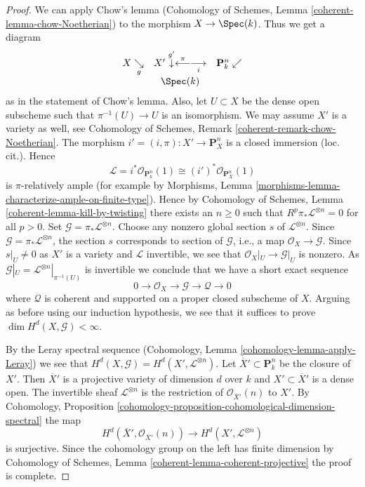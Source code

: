 \begin{proof}
\medskip\noindent
We can apply Chow's lemma
(Cohomology of Schemes, Lemma \ref{coherent-lemma-chow-Noetherian})
to the morphism $X \to \Spec(k)$. Thus we get a diagram
$$
\begin{array}{ccc}X \underset{g}{\searrow} & X' \overset{g'}{\downarrow}\overset{\pi}{\longleftarrow}\underset{i}{\longrightarrow} & \mathbf{P}^n_k \swarrow \\  & \Spec(k) & \end{array}
$$
as in the statement of Chow's lemma. Also, let $U \subset X$ be
the dense open subscheme such that $\pi^{-1}(U) \to U$ is an isomorphism.
We may assume $X'$ is a variety as well, see
Cohomology of Schemes, Remark \ref{coherent-remark-chow-Noetherian}.
The morphism $i' = (i, \pi) : X' \to \mathbf{P}^n_X$ is
a closed immersion (loc. cit.). Hence
$$
\mathcal{L} = i^*\mathcal{O}_{\mathbf{P}^n_k}(1) \cong
(i')^*\mathcal{O}_{\mathbf{P}^n_X}(1)
$$
is $\pi$-relatively ample (for example by
Morphisms, Lemma \ref{morphisms-lemma-characterize-ample-on-finite-type}).
Hence by Cohomology of Schemes, Lemma \ref{coherent-lemma-kill-by-twisting}
there exists an $n \geq 0$ such that
$R^p\pi_*\mathcal{L}^{\otimes n} = 0$ for all $p > 0$.
Set $\mathcal{G} = \pi_*\mathcal{L}^{\otimes n}$.
Choose any nonzero global section $s$ of $\mathcal{L}^{\otimes n}$.
Since $\mathcal{G} = \pi_*\mathcal{L}^{\otimes n}$, the section $s$
corresponds to section of $\mathcal{G}$, i.e., a map
$\mathcal{O}_X \to \mathcal{G}$.
Since $s|_U \not = 0$ as $X'$ is a variety and $\mathcal{L}$
invertible, we see that $\mathcal{O}_X|_U \to \mathcal{G}|_U$
is nonzero. As $\mathcal{G}|_U = \mathcal{L}^{\otimes n}|_{\pi^{-1}(U)}$
is invertible we conclude that we have a short exact sequence
$$
0 \to \mathcal{O}_X \to \mathcal{G} \to \mathcal{Q} \to 0
$$
where $\mathcal{Q}$ is coherent and supported on a proper
closed subscheme of $X$. Arguing as before using our induction
hypothesis, we see that it
suffices to prove $\dim H^d(X, \mathcal{G}) < \infty$.

\medskip\noindent
By the Leray spectral sequence
(Cohomology, Lemma \ref{cohomology-lemma-apply-Leray})
we see that $H^d(X, \mathcal{G}) = H^d(X', \mathcal{L}^{\otimes n})$.
Let $\overline{X}' \subset \mathbf{P}^n_k$ be the closure
of $X'$. Then $\overline{X}'$ is a projective variety of dimension $d$
over $k$ and $X' \subset \overline{X}'$ is a dense open.
The invertible sheaf $\mathcal{L}^{\otimes n}$ is the restriction of
$\mathcal{O}_{\overline{X}'}(n)$ to $X'$. By
Cohomology, Proposition
\ref{cohomology-proposition-cohomological-dimension-spectral}
the map
$$
H^d(\overline{X}', \mathcal{O}_{\overline{X}'}(n))
\longrightarrow
H^d(X', \mathcal{L}^{\otimes n})
$$
is surjective. Since the cohomology group on the left has
finite dimension by
Cohomology of Schemes, Lemma \ref{coherent-lemma-coherent-projective}
the proof is complete.
\end{proof}

